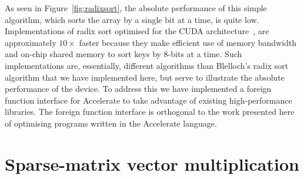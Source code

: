 As seen in Figure~\ref{fig:radixsort}, the absolute performance of this simple
algorithm, which sorts the array by a single bit at a time, is quite low.
Implementations of radix sort optimised for the CUDA
architecture~\cite{Satish:2009kx,Merrill:2011bz,ThrustAParallelT:ub}, are
approximately $10\times$ faster because they make efficient use of memory
bandwidth and on-chip shared memory to sort keys by 8-bits at a time. Such
implementations are, essentially, different algorithms than Blelloch's radix
sort algorithm that we have implemented here, but serve to illustrate the
absolute performance of the device. To address this we have implemented a
foreign function interface for Accelerate to take advantage of existing
high-performance libraries. The foreign function interface is orthogonal to the
work presented here of optimising programs written in the Accelerate language.


\section{Sparse-matrix vector multiplication}

\newcommand\spyplot[1]{\parbox[c][1.1cm][c]{1.1cm}{\texttt{[image: images/sec-6/smvm/\#1]}}}

